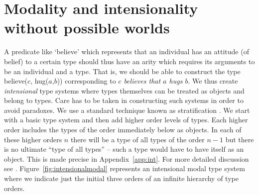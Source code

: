 \chapter{Modality and intensionality without possible worlds}
\label{ch:intensional}
\setcounter{equation}{0}


 A predicate like `believe' which represents that an individual has an
attitude (of belief) to a certain type should thus have an arity which
requires its arguments to be an individual and a type.  That is, we
should be able to construct the type believe($c$, hug($a$,$b$))
corresponding to \textit{$c$ believes that $a$ hugs $b$}.  We thus
create \textit{intensional} type systems where types themselves can be treated
as objects and belong to types.  Care has to be taken in constructing
such systems in order to avoid paradoxes.  We use a standard
technique known as stratification \cite{Turner2005}.  We start with a
basic type system and then add higher order levels of types.  Each
higher order includes the types of the order immediately below as
objects.  In each of these higher orders $n$ there will be a type of
all types of the order $n-1$ but there is no ultimate ``type of all
types'' -- such a type would have to have itself as an object.  This
is made precise in Appendix~\ref{app:int}.  For more detailed
discussion see \cite{Cooperforthcoming}.  
Figure~\ref{fig:intensionalmodal} represents an intensional modal type
system where we indicate just the initial
three orders of an infinite hierarchy of type orders.
